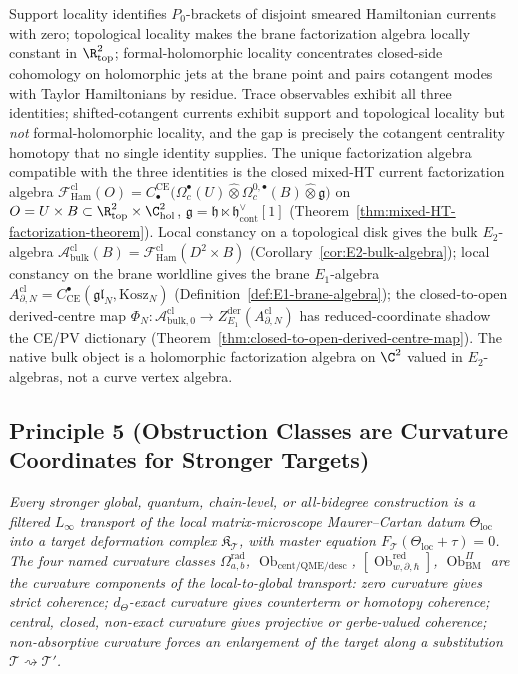 Support locality identifies \(P_0\)-brackets of disjoint smeared
Hamiltonian currents with zero; topological locality makes the brane
factorization algebra locally constant in \(\R^2_{\mathrm{top}}\);
formal-holomorphic locality concentrates closed-side cohomology on
holomorphic jets at the brane point and pairs cotangent modes with
Taylor Hamiltonians by residue.  Trace observables exhibit all three
identities; shifted-cotangent currents exhibit support and topological
locality but \emph{not} formal-holomorphic locality, and the gap is
precisely the cotangent centrality homotopy that no single identity
supplies.  The unique factorization algebra compatible with the three
identities is the closed mixed-HT current factorization algebra
\(\mathcal F^{\mathrm{cl}}_{\mathrm{Ham}}(O)
=C^{\mathrm{CE}}_\bullet\bigl(\Omega_c^\bullet(U)\widehat\otimes
\Omega_c^{0,\bullet}(B)\widehat\otimes\mathfrak g\bigr)\) on
\(O=U\times B\subset\R^2_{\mathrm{top}}\times\C^2_{\mathrm{hol}}\),
\(\mathfrak g=\mathfrak h\ltimes\mathfrak h^\vee_{\mathrm{cont}}[1]\)
(Theorem~\ref{thm:mixed-HT-factorization-theorem}).  Local
constancy on a topological disk gives the bulk \(E_2\)-algebra
\(\mathcal A^{\mathrm{cl}}_{\mathrm{bulk}}(B)
=\mathcal F^{\mathrm{cl}}_{\mathrm{Ham}}(D^2\times B)\)
(Corollary~\ref{cor:E2-bulk-algebra}); local constancy on the
brane worldline gives the brane \(E_1\)-algebra
\(A^{\mathrm{cl}}_{\partial,N}=
C^\bullet_{\mathrm{CE}}(\mathfrak{gl}_N,\mathrm{Kosz}_N)\)
(Definition~\ref{def:E1-brane-algebra}); the closed-to-open
derived-centre map
\(\Phi_N\colon\mathcal A^{\mathrm{cl}}_{\mathrm{bulk},0}\to
Z^{\mathrm{der}}_{E_1}(A^{\mathrm{cl}}_{\partial,N})\) has
reduced-coordinate shadow the CE/PV dictionary
(Theorem~\ref{thm:closed-to-open-derived-centre-map}).  The native
bulk object is a holomorphic factorization algebra on \(\C^2\)
valued in \(E_2\)-algebras, not a curve vertex algebra.

\subsection*{Principle 5 (Obstruction Classes are Curvature Coordinates for Stronger Targets)}

\emph{Every stronger global, quantum, chain-level, or all-bidegree
construction is a filtered \(L_\infty\) transport of the local
matrix-microscope Maurer--Cartan datum \(\Theta_{\mathrm{loc}}\) into
a target deformation complex \(\mathfrak K_{\mathcal T}\), with master
equation \(F_{\mathcal T}(\Theta_{\mathrm{loc}}+\tau)=0\).  The four
named curvature classes
\(\Omega^{\mathrm{rad}}_{a,b}\),
\(\operatorname{Ob}_{\mathrm{cent/QME/desc}}\),
\([\operatorname{Ob}^{\mathrm{red}}_{w,\partial,\hbar}]\),
\(\operatorname{Ob}^{\Pi}_{\mathrm{BM}}\)
are the curvature components of the local-to-global transport:
zero curvature gives strict coherence; \(d_\Theta\)-exact curvature
gives counterterm or homotopy coherence; central, closed,
non-exact curvature gives projective or gerbe-valued coherence;
non-absorptive curvature forces an enlargement of the target along a
substitution \(\mathcal T\rightsquigarrow\mathcal T'\).}

